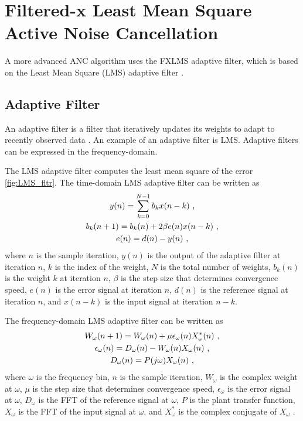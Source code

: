 \documentclass[11pt]{article}
\begin{document}
\section{Filtered-x Least Mean Square Active Noise Cancellation}
\label{sec:ANC_FXLMS}

A more advanced ANC algorithm uses the FXLMS adaptive filter, which is based on the Least Mean Square (LMS) adaptive filter \cite{kajikawa}.

\subsection{Adaptive Filter}

An adaptive filter is a filter that iteratively updates its weights to adapt to recently observed data \cite{feintuch}. An example of an adaptive filter is LMS. Adaptive filters can be expressed in the frequency-domain.

The LMS adaptive filter computes the least mean square of the error \cref{fig:LMS_fltr}. The time-domain LMS adaptive filter can be written as
\begin{gather}
    y(n) = \sum \limits_{k = 0}^{N - 1} b_k x(n - k) \text{ ,}\\
    b_k(n + 1) = b_k(n) + 2 \beta e(n) x(n - k) \text{ ,}\\
    e(n) = d(n) - y(n) \text{ ,}
\end{gather}
where $n$ is the sample iteration, $y(n)$ is the output of the adaptive filter at iteration $n$, $k$ is the index of the weight, $N$ is the total number of weights, $b_k(n)$ is the weight $k$ at iteration $n$, $\beta$ is the step size that determines convergence speed, $e(n)$ is the error signal at iteration $n$, $d(n)$ is the reference signal at iteration $n$, and $x(n - k)$ is the input signal at iteration $n - k$.


The frequency-domain LMS adaptive filter can be written as
\begin{gather} \label{eq:LMS_fltr}
    W_\omega(n+1) = W_\omega(n) + \mu \epsilon_\omega(n) X_\omega^*(n) \text{ ,}\\
    \epsilon_\omega(n) = D_\omega(n) - W_\omega(n) X_\omega(n)  \text{ ,}\\
    D_\omega(n) = P(j \omega) X_\omega(n) \text{ ,}
\end{gather}
where $\omega$ is the frequency bin, $n$ is the sample iteration, $W_\omega$ is the complex weight at $\omega$, $\mu$ is the step size that determines convergence speed, $\epsilon_\omega$ is the error signal at $\omega$, $D_\omega$ is the FFT of the reference signal at $\omega$, $P$ is the plant transfer function, $X_\omega$ is the FFT of the input signal at $\omega$, and $X_\omega^*$ is the complex conjugate of $X_\omega$ \cite{feintuch}.
\end{document}
